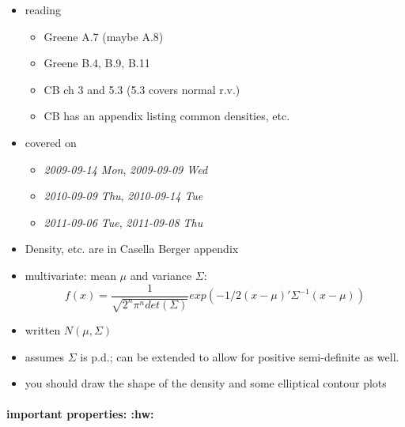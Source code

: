 \begin{itemize}
\item reading
\begin{itemize}
\item Greene A.7 (maybe A.8)
\item Greene B.4, B.9, B.11
\item CB ch 3 and 5.3 (5.3 covers normal r.v.)
\item CB has an appendix listing common densities, etc.
\end{itemize}
\item covered on
\begin{itemize}
\item \textit{2009-09-14 Mon}, \textit{2009-09-09 Wed}
\item \textit{2010-09-09 Thu}, \textit{2010-09-14 Tue}
\item \textit{2011-09-06 Tue}, \textit{2011-09-08 Thu}
\end{itemize}
\item Density, etc. are in Casella Berger appendix
\item multivariate: mean $\mu$ and variance $\Sigma$:
      \[ f(x) = \frac{1}{\sqrt{2^n \pi^n det(\Sigma)}} exp(-1/2(x -
      \mu)'\Sigma^{-1}(x- \mu)) \]
\item written $N(\mu, \Sigma)$
\item assumes $\Sigma$ is p.d.; can be extended to allow for positive
      semi-definite as well.
\item you should draw the shape of the density and some elliptical
      contour plots
\end{itemize}
\paragraph{important properties: \textbf{:hw:}}
\label{sec-3-2-1}

